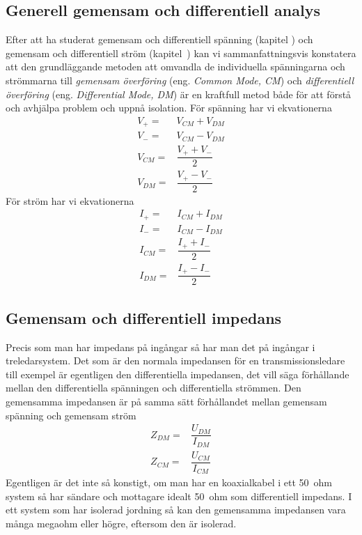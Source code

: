 \subsection{Generell gemensam och differentiell analys}
\label{comdiffgeneric}

Efter att ha studerat gemensam och differentiell spänning (kapitel
) och gemensam och differentiell ström (kapitel~)
kan vi sammanfattningsvis konstatera att den grundläggande metoden att omvandla
de individuella spänningarna och strömmarna till \emph{gemensam överföring}
(eng. \emph{Common Mode, CM}) och \emph{differentiell överföring}
(eng. \emph{Differential Mode, DM}) är en kraftfull metod både för att
förstå och avhjälpa problem och uppnå isolation.
För spänning har vi ekvationerna
\begin{eqnarray*}
V_+ = & V_{CM} + V_{DM}\\
V_- = & V_{CM} - V_{DM}\\
V_{CM} = & \dfrac{V_+ + V_-}{2}\\
V_{DM} = & \dfrac{V_+ - V_-}{2}
\end{eqnarray*}
För ström har vi ekvationerna
\begin{eqnarray*}
I_+ = & I_{CM} + I_{DM}\\
I_- = & I_{CM} - I_{DM}\\
I_{CM} = & \dfrac{I_+ + I_-}{2}\\
I_{DM} = & \dfrac{I_+ - I_-}{2}
\end{eqnarray*}

\subsection{Gemensam och differentiell impedans}

Precis som man har impedans på ingångar så har man det på ingångar i
treledarsystem.
Det som är den normala impedansen för en transmissionsledare till exempel är
egentligen den differentiella impedansen, det vill säga förhållande mellan den
differentiella spänningen och differentiella strömmen.
Den gemensamma impedansen är på samma sätt förhållandet mellan gemensam
spänning och gemensam ström
\begin{eqnarray*}
Z_{DM} = & \dfrac{U_{DM}}{I_{DM}}\\
Z_{CM} = & \dfrac{U_{CM}}{I_{CM}}
\end{eqnarray*}
Egentligen är det inte så konstigt, om man har en koaxialkabel i ett 50~ohm
system så har sändare och mottagare idealt 50~ohm som differentiell impedans.
I ett system som har isolerad jordning så kan den gemensamma impedansen vara
många megaohm eller högre, eftersom den är isolerad.

